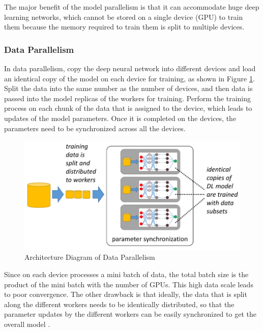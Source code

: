 The major benefit of the model parallelism is that it can accommodate huge deep learning networks, which cannot be stored on a single device (GPU) to train them because the memory required to train them is split to multiple devices. 

\subsubsection{Data Parallelism}
In data parallelism, copy the deep neural network into different devices and load an identical copy of the model on each device for training, as shown in Figure \ref{fig:dataparallel}. Split the data into the same number as the number of devices, and then data is passed into the model replicas of the workers for training. Perform the training process on each chunk of the data that is assigned to the device, which leads to updates of the model parameters. Once it is completed on the devices, the parameters need to be synchronized across all the devices. 

\begin{figure}[ht]
  \begin{center}
    \includegraphics[width=\textwidth]{images/data parallelism.png} 
    \caption{Architecture Diagram of Data Parallelism  \cite{Mayer2020ScalableInfrastructures}}
    \label{fig:dataparallel}
  \end{center}
\end{figure}

Since on each device processes a mini batch of data, the total batch size is the product of the mini batch with the number of GPUs. This high data scale leads to poor convergence. The other drawback is that ideally, the data that is split along the different workers needs to be identically distributed, so that the parameter updates by the different workers can be easily synchronized to get the overall model \cite{Jia2018BeyondNetworks}.


